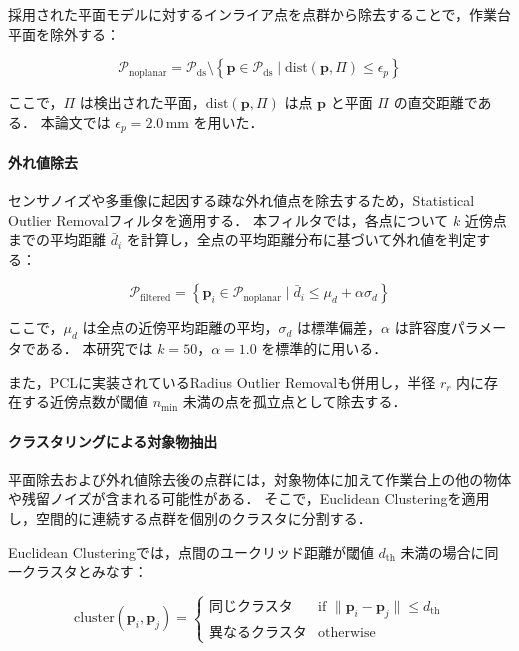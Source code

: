 採用された平面モデルに対するインライア点を点群から除去することで，作業台平面を除外する：

\begin{equation}
  \mathcal{P}_{\mathrm{noplanar}} = \mathcal{P}_{\mathrm{ds}} \setminus \left\{ \bm{p} \in \mathcal{P}_{\mathrm{ds}} \;|\; \mathrm{dist}(\bm{p}, \Pi) \leq \epsilon_p \right\}
  \label{eq:system:plane_removal}
\end{equation}

ここで，$\Pi$ は検出された平面，$\mathrm{dist}(\bm{p}, \Pi)$ は点 $\bm{p}$ と平面 $\Pi$ の直交距離である．
本論文では $\epsilon_p = 2.0$\,mm を用いた．

\paragraph{外れ値除去}

センサノイズや多重像に起因する疎な外れ値点を除去するため，Statistical Outlier Removalフィルタを適用する．
本フィルタでは，各点について $k$ 近傍点までの平均距離 $\bar{d}_i$ を計算し，全点の平均距離分布に基づいて外れ値を判定する：

\begin{equation}
  \mathcal{P}_{\mathrm{filtered}} = \left\{ \bm{p}_i \in \mathcal{P}_{\mathrm{noplanar}} \;|\; \bar{d}_i \leq \mu_d + \alpha \sigma_d \right\}
\end{equation}

ここで，$\mu_d$ は全点の近傍平均距離の平均，$\sigma_d$ は標準偏差，$\alpha$ は許容度パラメータである．
本研究では $k = 50$，$\alpha = 1.0$ を標準的に用いる．

また，PCLに実装されているRadius Outlier Removal\cite{PCL-method}も併用し，半径 $r_r$ 内に存在する近傍点数が閾値 $n_{\min}$ 未満の点を孤立点として除去する．

\paragraph{クラスタリングによる対象物抽出}

平面除去および外れ値除去後の点群には，対象物体に加えて作業台上の他の物体や残留ノイズが含まれる可能性がある．
そこで，Euclidean Clustering\cite{PCL-method}を適用し，空間的に連続する点群を個別のクラスタに分割する．

Euclidean Clusteringでは，点間のユークリッド距離が閾値 $d_{\mathrm{th}}$ 未満の場合に同一クラスタとみなす：

\begin{equation}
  \mathrm{cluster}(\bm{p}_i, \bm{p}_j) = \begin{cases}
    \text{同じクラスタ} & \text{if } \|\bm{p}_i - \bm{p}_j\| \leq d_{\mathrm{th}} \\
    \text{異なるクラスタ} & \text{otherwise}
  \end{cases}
\end{equation}

